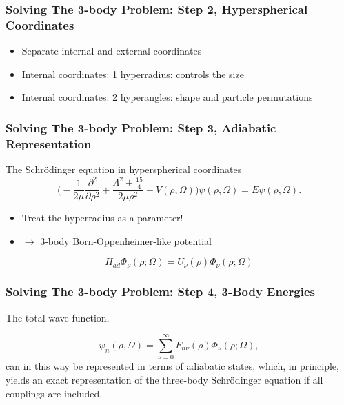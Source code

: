 \documentclass[hideothersubsections]{beamer}
\begin{document}
\begin{frame}
\frametitle{Solving The 3-body Problem: Step 2, Hyperspherical Coordinates}
\begin{itemize}
	\item Separate internal and external coordinates
	\item Internal coordinates: 1 hyperradius: controls the size 
	\item Internal coordinates: 2 hyperangles: shape and particle permutations
\end{itemize}
\end{frame}

\begin{frame}[label=supplemental]
\frametitle{Solving The 3-body Problem: Step 3, Adiabatic Representation}
The Schr{\"o}dinger equation in hyperspherical coordinates
\begin{equation}
\bigg(-\frac{1}{2 \mu}\frac{\partial^2}{\partial \rho^2} + \frac{ \Lambda^2 + \frac{15}{4}}{2 \mu \rho^{2}}+ V(\rho,\Omega)\bigg)\psi(\rho,\Omega) = E\psi(\rho,\Omega).
\end{equation}

\begin{itemize}
\item Treat the hyperradius as a parameter! 

\item $\rightarrow$ 3-body Born-Oppenheimer-like potential
\end{itemize}
\begin{equation}\label{adiabatic}
H_{ad}\Phi_{\nu}{(\rho;\Omega)} = U_{\nu}{(\rho)}\Phi_{\nu}(\rho;\Omega)
\end{equation}
\hyperlink{matrix}{}
\end{frame}


\begin{frame}
\frametitle{Solving The 3-body Problem: Step 4, 3-Body Energies}
The total wave function, 

\begin{equation}\label{wave}
\psi_{n}(\rho,\Omega) = \sum_{\nu=0}^{\infty} F_{n\nu}(\rho)\Phi_{\nu}(\rho;\Omega),
\end{equation}
can in this way be represented in terms of adiabatic states, which, in principle, yields an exact representation of the three-body Schr{\"o}dinger equation if all couplings are included.
\end{frame}
\end{document}
